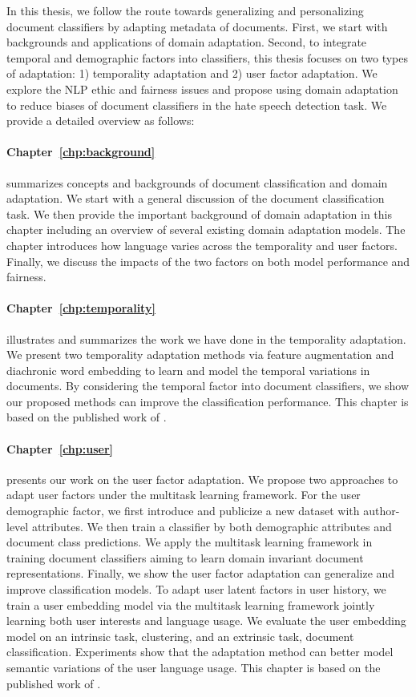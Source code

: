 In this thesis, we follow the route towards generalizing and personalizing document classifiers by adapting metadata of documents.
First, we start with backgrounds and applications of domain adaptation.
Second, to integrate temporal and demographic factors into classifiers, this thesis focuses on two types of adaptation: 1) temporality adaptation and 2) user factor adaptation.
We explore the NLP ethic and fairness issues and propose using domain adaptation to reduce biases of document classifiers in the hate speech detection task.
We provide a detailed overview as follows:

\paragraph{Chapter~\ref{chp:background}} summarizes concepts and backgrounds of document classification and domain adaptation. We start with a general discussion of the document classification task. We then provide the important background of domain adaptation in this chapter including an overview of several existing domain adaptation models. The chapter introduces how language varies across the temporality and user factors. Finally, we discuss the impacts of the two factors on both model performance and fairness.

\paragraph{Chapter~\ref{chp:temporality}} illustrates and summarizes the work we have done in the temporality adaptation. We present two temporality adaptation methods via feature augmentation and diachronic word embedding to learn and model the temporal variations in documents. By considering the temporal factor into document classifiers, we show our proposed methods can improve the classification performance. This chapter is based on the published work of \cite{huang2018examining, huang2019neural}.

\paragraph{Chapter~\ref{chp:user}} presents our work on the user factor adaptation. We propose two approaches to adapt user factors under the multitask learning framework. For the user demographic factor, we first introduce and publicize a new dataset with author-level attributes. We then train a classifier by both demographic attributes and document class predictions. We apply the multitask learning framework in training document classifiers aiming to learn domain invariant document representations. Finally, we show the user factor adaptation can generalize and improve classification models. To adapt user latent factors in user history, we train a user embedding model via the multitask learning framework jointly learning both user interests and language usage. We evaluate the user embedding model on an intrinsic task, clustering, and an extrinsic task, document classification. Experiments show that the adaptation method can better model semantic variations of the user language usage. This chapter is based on the published work of \cite{huang2019neuraluser, huang2020user}.

